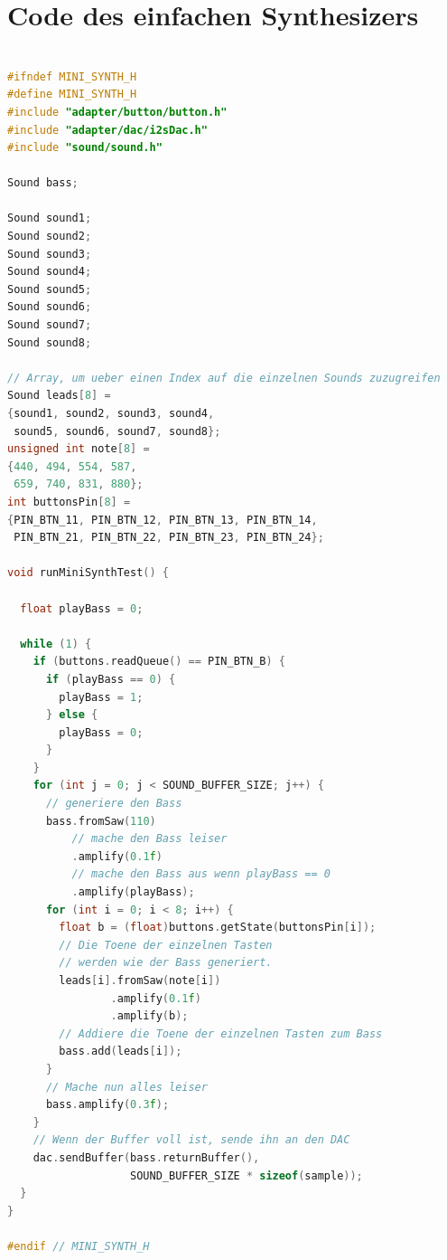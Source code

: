 \section{Code des einfachen Synthesizers}
\label{sec:simple_synth_code}

\begin{lstlisting}[language=C++, 
                   frame=single, 
                   caption={Code des einfachen Synthesizers},
                   captionpos=b]

#ifndef MINI_SYNTH_H
#define MINI_SYNTH_H
#include "adapter/button/button.h"
#include "adapter/dac/i2sDac.h"
#include "sound/sound.h"

Sound bass;

Sound sound1;
Sound sound2;
Sound sound3;
Sound sound4;
Sound sound5;
Sound sound6;
Sound sound7;
Sound sound8;

// Array, um ueber einen Index auf die einzelnen Sounds zuzugreifen
Sound leads[8] = 
{sound1, sound2, sound3, sound4,
 sound5, sound6, sound7, sound8};
unsigned int note[8] = 
{440, 494, 554, 587, 
 659, 740, 831, 880};
int buttonsPin[8] = 
{PIN_BTN_11, PIN_BTN_12, PIN_BTN_13, PIN_BTN_14, 
 PIN_BTN_21, PIN_BTN_22, PIN_BTN_23, PIN_BTN_24};

void runMiniSynthTest() {

  float playBass = 0;

  while (1) {
    if (buttons.readQueue() == PIN_BTN_B) {
      if (playBass == 0) {
        playBass = 1;
      } else {
        playBass = 0;
      }
    }
    for (int j = 0; j < SOUND_BUFFER_SIZE; j++) {
      // generiere den Bass
      bass.fromSaw(110)       
          // mache den Bass leiser
          .amplify(0.1f)      
          // mache den Bass aus wenn playBass == 0
          .amplify(playBass); 
      for (int i = 0; i < 8; i++) {
        float b = (float)buttons.getState(buttonsPin[i]);
        // Die Toene der einzelnen Tasten
        // werden wie der Bass generiert.
        leads[i].fromSaw(note[i])  
                .amplify(0.1f)     
                .amplify(b);
        // Addiere die Toene der einzelnen Tasten zum Bass
        bass.add(leads[i]);   
      }
      // Mache nun alles leiser
      bass.amplify(0.3f);     
    }
    // Wenn der Buffer voll ist, sende ihn an den DAC
    dac.sendBuffer(bass.returnBuffer(),
                   SOUND_BUFFER_SIZE * sizeof(sample));
  }
}

#endif // MINI_SYNTH_H
    
\end{lstlisting}